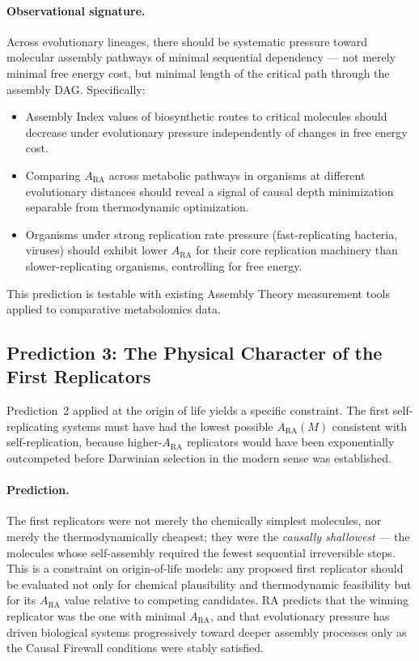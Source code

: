 \documentclass[11pt,a4paper]{article}
\theoremstyle{plain}
\theoremstyle{definition}
\theoremstyle{remark}
\newcommand{\ARA}{A_{\mathrm{RA}}}
\begin{document}
\paragraph{Observational signature.}
Across evolutionary lineages, there should be systematic pressure toward molecular
assembly pathways of minimal sequential dependency --- not merely minimal free
energy cost, but minimal length of the critical path through the assembly DAG.
Specifically:
\begin{itemize}
  \item Assembly Index values of biosynthetic routes to critical molecules should
  decrease under evolutionary pressure independently of changes in free energy
  cost.
  \item Comparing $\ARA$ across metabolic pathways in organisms at different
  evolutionary distances should reveal a signal of causal depth minimization
  separable from thermodynamic optimization.
  \item Organisms under strong replication rate pressure (fast-replicating
  bacteria, viruses) should exhibit lower $\ARA$ for their core replication
  machinery than slower-replicating organisms, controlling for free energy.
\end{itemize}
This prediction is testable with existing Assembly Theory measurement
tools~\citep{Murray2023} applied to comparative metabolomics data.

\subsection{Prediction 3: The Physical Character of the First Replicators}

Prediction~2 applied at the origin of life yields a specific constraint. The first
self-replicating systems must have had the lowest possible $\ARA(M)$ consistent
with self-replication, because higher-$\ARA$ replicators would have been
exponentially outcompeted before Darwinian selection in the modern sense was
established.

\paragraph{Prediction.}
The first replicators were not merely the chemically simplest molecules, nor
merely the thermodynamically cheapest; they were the \emph{causally shallowest}
--- the molecules whose self-assembly required the fewest sequential irreversible
steps. This is a constraint on origin-of-life models: any proposed first replicator
should be evaluated not only for chemical plausibility and thermodynamic
feasibility but for its $\ARA$ value relative to competing candidates. RA predicts
that the winning replicator was the one with minimal $\ARA$, and that evolutionary
pressure has driven biological systems progressively toward deeper assembly
processes only as the Causal Firewall conditions were stably satisfied.
\end{document}

